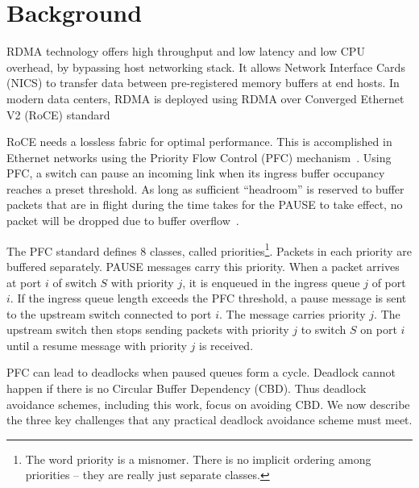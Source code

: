 \section{Background} \label{sec:background}  RDMA
technology offers high throughput and low latency and low CPU overhead, by
bypassing host networking stack. It allows Network Interface Cards (NICS) to
transfer data between pre-registered memory buffers at end hosts.  In modern
data centers, RDMA is deployed using RDMA over Converged Ethernet V2 (RoCE)
standard~\cite{rroce}

 RoCE needs a lossless fabric for optimal performance. This is
accomplished in Ethernet networks using the Priority Flow Control (PFC)
mechanism~\cite{pfc}.  Using PFC, a switch can pause an incoming link when its
ingress buffer occupancy reaches a preset threshold. As long as sufficient
``headroom'' is reserved to buffer packets that are in flight during the time
takes for the PAUSE to take effect, no packet will be dropped due to buffer
overflow~\cite{cisco-whitepaper,dcqcn}.

The PFC standard defines 8 classes, called priorities\footnote{The word priority
is a misnomer. There is no implicit ordering among priorities -- they are really
just separate classes.}. Packets in each priority are buffered separately.
PAUSE messages carry this priority.  When a packet arrives at port $i$ of switch
$S$ with priority $j$, it is enqueued in the ingress queue $j$ of port $i$. If the ingress queue
length exceeds the PFC threshold, a pause message is sent to the upstream
switch connected to port $i$. The message carries priority $j$. The upstream
switch then stops sending packets with priority $j$ to switch $S$ on port $i$
until a resume message with priority $j$ is received.

 PFC can lead to deadlocks when paused queues form a cycle. Deadlock cannot happen if there is no Circular Buffer Dependency (CBD). Thus deadlock avoidance schemes, including this work, focus on
avoiding CBD.  We now describe the three key challenges that any
practical deadlock avoidance scheme must meet.
